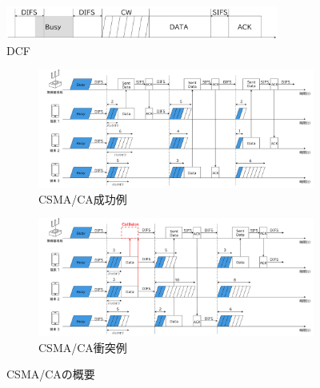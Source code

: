\documentclass[a4paper,10pt]{ltjsarticle}
\begin{document}
\begin{figure}[H]
  \centering
  \includegraphics[width=0.8\textwidth]{./assets/DCF.png}
  \caption{DCF}
  \label{fig:DCF}

\end{figure}


\begin{figure}[H]
  \centering

  \begin{subfigure}{\textwidth}
    \centering
    \includegraphics[width=1\textwidth]{./assets/csma-ca-s.png}
    \caption{CSMA/CA成功例}
    \label{1a}
  \end{subfigure}


  \begin{subfigure}{\textwidth}
    \centering
    \includegraphics[width=1\textwidth]{./assets/csma-ca-f.png}
    \caption{CSMA/CA衝突例}
    \label{1b}
  \end{subfigure}


  \caption{CSMA/CAの概要}
  \label{CSMA/CA}
\end{figure}
\end{document}
